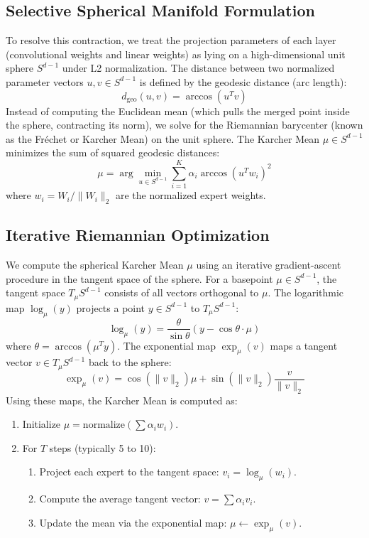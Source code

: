 \documentclass{article}
\begin{document}
\subsection{Selective Spherical Manifold Formulation}
To resolve this contraction, we treat the projection parameters of each layer (convolutional weights and linear weights) as lying on a high-dimensional unit sphere $S^{d-1}$ under L2 normalization. The distance between two normalized parameter vectors $u, v \in S^{d-1}$ is defined by the geodesic distance (arc length):
\begin{equation}
  d_{\text{geo}}(u, v) = \arccos(u^T v)
\end{equation}
Instead of computing the Euclidean mean (which pulls the merged point inside the sphere, contracting its norm), we solve for the Riemannian barycenter (known as the Fréchet or Karcher Mean) on the unit sphere. The Karcher Mean $\mu \in S^{d-1}$ minimizes the sum of squared geodesic distances:
\begin{equation}
  \mu = \arg\min_{u \in S^{d-1}} \sum_{i=1}^K \alpha_i \arccos(u^T w_i)^2
\end{equation}
where $w_i = W_i / \|W_i\|_2$ are the normalized expert weights.

\subsection{Iterative Riemannian Optimization}
We compute the spherical Karcher Mean $\mu$ using an iterative gradient-ascent procedure in the tangent space of the sphere.
For a basepoint $\mu \in S^{d-1}$, the tangent space $T_\mu S^{d-1}$ consists of all vectors orthogonal to $\mu$. The logarithmic map $\log_\mu(y)$ projects a point $y \in S^{d-1}$ to $T_\mu S^{d-1}$:
\begin{equation}
  \log_\mu(y) = \frac{\theta}{\sin\theta} (y - \cos\theta \cdot \mu)
\end{equation}
where $\theta = \arccos(\mu^T y)$. The exponential map $\exp_\mu(v)$ maps a tangent vector $v \in T_\mu S^{d-1}$ back to the sphere:
\begin{equation}
  \exp_\mu(v) = \cos(\|v\|_2) \mu + \sin(\|v\|_2) \frac{v}{\|v\|_2}
\end{equation}
Using these maps, the Karcher Mean is computed as:
\begin{enumerate}
  \item Initialize $\mu = \text{normalize}(\sum \alpha_i w_i)$.
  \item For $T$ steps (typically 5 to 10):
        \begin{enumerate}
          \item Project each expert to the tangent space: $v_i = \log_\mu(w_i)$.
          \item Compute the average tangent vector: $v = \sum \alpha_i v_i$.
          \item Update the mean via the exponential map: $\mu \leftarrow \exp_\mu(v)$.
        \end{enumerate}
\end{enumerate}
\end{document}
